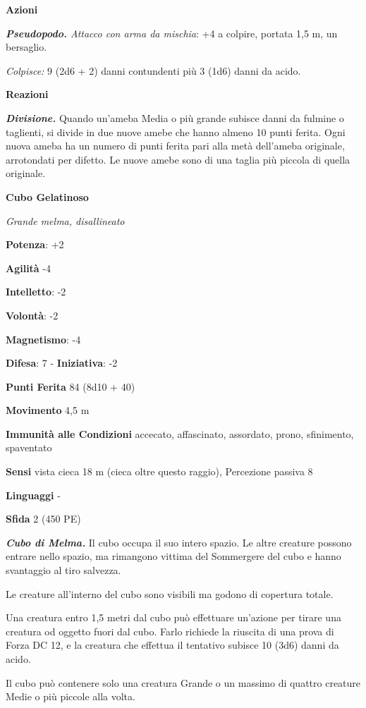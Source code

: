\begin{multicols}{2}
\textbf{Azioni}

\emph{\textbf{Pseudopodo.} Attacco con arma da mischia}: +4 a colpire,
portata 1,5 m, un bersaglio.

\emph{Colpisce:} 9 (2d6 + 2) danni contundenti più 3 (1d6) danni da
acido.

\textbf{Reazioni}

\emph{\textbf{Divisione.}} Quando un'ameba Media o più grande subisce
danni da fulmine o taglienti, si divide in due nuove amebe che hanno
almeno 10 punti ferita. Ogni nuova ameba ha un numero di punti ferita
pari alla metà dell'ameba originale, arrotondati per difetto. Le nuove
amebe sono di una taglia più piccola di quella originale.

\textbf{Cubo Gelatinoso}

\emph{Grande melma, disallineato}

\textbf{Potenza}: +2

\textbf{Agilità} -4

\textbf{Intelletto}: -2

\textbf{Volontà}: -2

\textbf{Magnetismo}: -4

\textbf{Difesa}: 7 - \textbf{Iniziativa}: -2

\textbf{Punti Ferita} 84 (8d10 + 40)

\textbf{Movimento} 4,5 m

\textbf{Immunità alle Condizioni} accecato, affascinato, assordato,
prono, sfinimento, spaventato

\textbf{Sensi} vista cieca 18 m (cieca oltre questo raggio), Percezione
passiva 8

\textbf{Linguaggi} -

\textbf{Sfida} 2 (450 PE)

\emph{\textbf{Cubo di Melma.}} Il cubo occupa il suo intero spazio. Le
altre creature possono entrare nello spazio, ma rimangono vittima del
Sommergere del cubo e hanno svantaggio al tiro salvezza.

Le creature all'interno del cubo sono visibili ma godono di copertura
totale.

Una creatura entro 1,5 metri dal cubo può effettuare un'azione per
tirare una creatura od oggetto fuori dal cubo. Farlo richiede la
riuscita di una prova di Forza DC 12, e la creatura che effettua il
tentativo subisce 10 (3d6) danni da acido.

Il cubo può contenere solo una creatura Grande o un massimo di quattro
creature Medie o più piccole alla volta.


\end{multicols}
